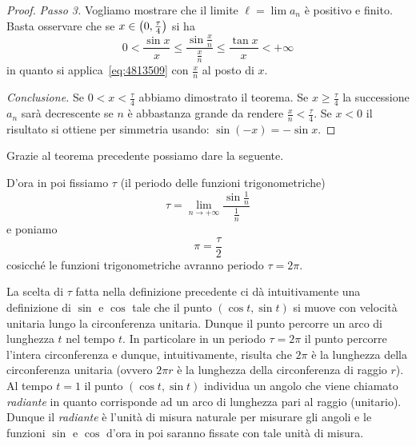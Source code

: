 \begin{proof}
\emph{Passo 3.}
Vogliamo mostrare che il limite $\ell=\lim a_n$ è positivo e 
finito.
Basta osservare che se $x\in\left(0,\frac \tau 4\right)$
si ha
\[
0 < \frac{\sin x}{x} 
\le \frac{\sin \frac x n}{\frac x n} 
\le \frac{\tan x}{x} < +\infty
\]
in quanto si applica~\eqref{eq:4813509} 
con $\frac x n$ al posto di $x$. 

\emph{Conclusione.}
Se $0<x<\frac \tau 4$ abbiamo dimostrato il teorema.
Se $x\ge \frac \tau 4$ la successione $a_n$ sarà decrescente 
se $n$ è abbastanza grande da rendere $\frac x n< \frac \tau 4$.
Se $x<0$ il risultato si ottiene per simmetria usando: $\sin(-x)=-\sin x$.
\end{proof}

Grazie al teorema precedente possiamo dare la seguente.
\begin{definition}%
  \label{def:pi}%
D'ora in poi fissiamo $\tau$ 
(il periodo delle funzioni trigonometriche)
\[
 \tau = \lim_{n\to +\infty} \frac{\sin \frac 1 n}{\frac 1 n}
\]
e poniamo 
\[
  \pi = \frac \tau 2
\]
cosicché le funzioni trigonometriche avranno 
periodo $\tau = 2\pi$.
\end{definition}

La scelta di $\tau$ fatta nella definizione precedente 
ci dà intuitivamente una definizione di $\sin$ e $\cos$ tale 
che il punto $(\cos t,\sin t)$ si muove con velocità unitaria lungo 
la circonferenza unitaria. 
Dunque il punto percorre un arco di lunghezza $t$ nel tempo $t$.
In particolare in un periodo $\tau=2\pi$ il punto percorre l'intera 
circonferenza e dunque, intuitivamente, risulta che $2\pi$ è la lunghezza 
della circonferenza unitaria (ovvero $2\pi r$ è la lunghezza della circonferenza 
di raggio $r$).
Al tempo $t=1$ il punto $(\cos t,\sin t)$ individua un angolo che 
viene chiamato \emph{radiante} in quanto corrisponde ad un arco di lunghezza 
pari al raggio (unitario). 
Dunque il \emph{radiante} è l'unità di misura naturale per misurare gli angoli 
e le funzioni $\sin$ e $\cos$ d'ora in poi saranno fissate con tale unità di misura.

